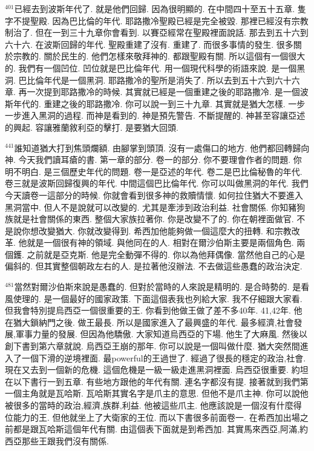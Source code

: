 \documentclass{book}
\begin{document}
$^{401}$已經去到波斯年代了.
就是他們回歸.
因為很明顯的.
在中間四十至五十五章.
隻字不提聖殿.
因為巴比倫的年代.
耶路撒冷聖殿已經是完全被毀.
那裡已經沒有宗教制治了.
但在一到三十九章你會看到.
以賽亞經常在聖殿裡面說話.
那去到五十六到六十六.
在波斯回歸的年代.
聖殿重建了沒有.
重建了.
而很多事情的發生.
很多關於宗教的.
關於民生的.
他們怎樣來敬拜神的.
都跟聖殿有關.
所以這個有一個很大的.
我們有一個凹位.
凹位就是巴比倫年代.
用一個現代科學的術語來說.
是一個黑洞.
巴比倫年代是一個黑洞.
耶路撒冷的聖所是消失了.
所以去到五十六到六十六章.
再一次提到耶路撒冷的時候.
其實就已經是一個重建之後的耶路撒冷.
是一個波斯年代的.
重建之後的耶路撒冷.
你可以說一到三十九章.
其實就是猶大怎樣.
一步一步進入黑洞的過程.
而神是看到的.
神是預先警告.
不斷提醒的.
神甚至容讓亞述的興起.
容讓雅蘭敘利亞的擊打.
是要猶大回頭.

$^{441}$誰知道猶大打到焦頭爛額.
由腳掌到頭頂.
沒有一處傷口的地方.
他們都回轉歸向神.
今天我們讀耳瘡的書.
第一章的部分.
卷一的部分.
你不要理會作者的問題.
你明不明白.
是三個歷史年代的問題.
卷一是亞述的年代.
卷二是巴比倫秘魯的年代.
卷三就是波斯回歸復興的年代.
中間這個巴比倫年代.
你可以叫做黑洞的年代.
我們今天讀卷一這部分的時候.
你就會看到很多神的救贖情懷.
如何拉住猶大不要進入黑洞當中.
但人不是說就可以改變的.
尤其是牽涉到政治利益.
社會關係.
你知豬狗族就是社會關係的東西.
整個大家族拉著你.
你是改變不了的.
你在朝裡面做官.
不是說你想改變猶大.
你就改變得到.
希西加他能夠做一個這麼大的扭轉.
和宗教改革.
他就是一個很有神的領域.
與他同在的人.
相對在爾沙伯斯主要是兩個角色.
兩個鑊.
之前就是亞克斯.
他是完全動彈不得的.
你以為他拜偶像.
當然他自己的心是偏斜的.
但其實整個朝政左右的人.
是拉著他沒辦法.
不去做這些愚蠢的政治決定.

$^{481}$當然對爾沙伯斯來說是愚蠢的.
但對於當時的人來說是精明的.
是合時勢的.
是看風使理的.
是一個最好的國家政策.
下面這個表我也列給大家.
我不仔細跟大家看.
但我會特別提烏西亞一個很重要的王.
你看到他做王做了差不多40年.
41,42年.
他在猶大鎖納門之後.
做王最長.
所以是國家進入了最興盛的年代.
最多經濟,社會發展,軍事力量的發展.
但因為他驕傲.
大家知道烏西亞的下場.
他生了大麻風.
然後以創下書到第六章就說.
烏西亞王崩的那年.
你可以說是一個叫做什麼.
猶大突然間進入了一個下滑的逆境裡面.
最powerful的王過世了.
經過了很長的穩定的政治,社會.
現在又去到一個新的危機.
這個危機是一級一級走進黑洞裡面.
烏西亞很重要.
約坦在以下書行一到五章.
有些地方跟他的年代有關.
連名字都沒有提.
接著就到我們第一個主角就是瓦哈斯.
瓦哈斯其實名字是爪主的意思.
但他不是爪主神.
你可以說他被很多的當時的政治,經濟,族群,利益.
他被這些爪主.
他應該說是一個沒有什麼得位能力的王.
但他就坐上了大衛家的王位.
而以下書很多前面卷一.
在希西加出場之前都是跟瓦哈斯這個年代有關.
由這個表下面就是到希西加.
其實馬來西亞,阿滿,約西亞那些王跟我們沒有關係.
\end{document}
